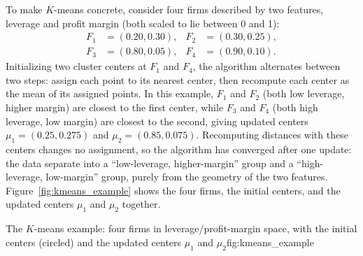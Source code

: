 \documentclass[../ai_in_finance]{subfiles}
\begin{document}
To make $K$-means concrete, consider four firms described by two features, leverage and profit margin (both scaled to lie between 0 and 1):
\begin{align*}
F_1 &= (0.20, 0.30), & F_2 &= (0.30, 0.25), \\
F_3 &= (0.80, 0.05), & F_4 &= (0.90, 0.10).
\end{align*}
Initializing two cluster centers at $F_1$ and $F_4$, the algorithm alternates between two steps: assign each point to its nearest center, then recompute each center as the mean of its assigned points. In this example, $F_1$ and $F_2$ (both low leverage, higher margin) are closest to the first center, while $F_3$ and $F_4$ (both high leverage, low margin) are closest to the second, giving updated centers $\mu_1 = (0.25, 0.275)$ and $\mu_2 = (0.85, 0.075)$. Recomputing distances with these centers changes no assignment, so the algorithm has converged after one update: the data separate into a ``low-leverage, higher-margin'' group and a ``high-leverage, low-margin'' group, purely from the geometry of the two features. Figure~\ref{fig:kmeans_example} shows the four firms, the initial centers, and the updated centers $\mu_1$ and $\mu_2$ together.

\begin{bookfigure}[htbp]{The $K$-means example: four firms in leverage/profit-margin space, with the initial centers (circled) and the updated centers $\mu_1$ and $\mu_2$}{fig:kmeans_example}
\end{bookfigure}
\end{document}
